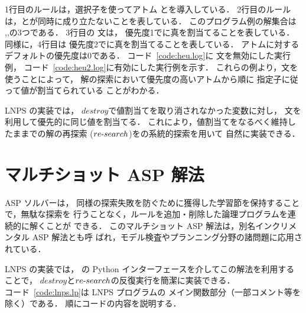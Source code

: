 1行目のルールは，選択子を使ってアトム
とを導入している．
2行目のルールは，とが同時に成り立たないことを表している．
このプログラム例の解集合は
\code{\{\}},,の3つである．
3行目の 文は，
優先度1でに真を割当てることを表している．
同様に，4行目は
優先度2でに真を割当てることを表している．
アトムに対するデフォルトの優先度は0である．
%
コード~\ref{code:heu.log}に 文を無効にした実行例，
コード~\ref{code:heu2.log}に有効にした実行例を示す．
これらの例より，文を使うことによって，
解の探索において優先度の高いアトムから順に
指定子に従って値が割当てられている
ことがわかる．

LNPS の実装では，
$destroy$で値割当てを取り消されなかった変数に対し，
文を利用して優先的に同じ値を割当てる．
これにより，値割当てをなるべく維持したままでの解の再探索
($re\mathchar`-search$)を{\clingo}の系統的探索を用いて
自然に実装できる．\\

\section{マルチショット ASP 解法}







ASP ソルバー{\clingo}は，
同様の探索失敗を防ぐために獲得した学習節を保持することで，無駄な探索を
行うことなく，ルールを追加・削除した論理プログラムを連続的に解くことが
できる．
このマルチショット ASP 解法は，別名インクリメンタル ASP 解法とも呼
ばれ，モデル検査やプランニング分野の諸問題に応用されている．

LNPS の実装では，
{\clingo}の Python インターフェースを介してこの解法を利用することで，
$destroy$と$re\mathchar`-search$の反復実行を簡潔に実装できる．\\

コード~\ref{code:lnps.lp}は LNPS プログラムの
メイン関数部分（一部コメント等を除く）である．
順にコードの内容を説明する．\\



